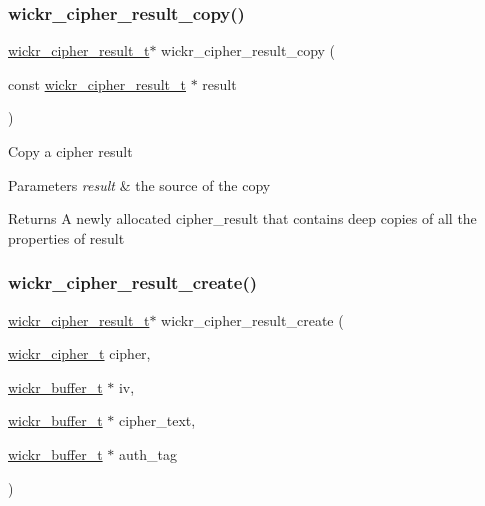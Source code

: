 \subsubsection{\texorpdfstring{wickr\_cipher\_result\_copy()}{wickr\_cipher\_result\_copy()}}
{\footnotesize\ttfamily \mbox{\hyperlink{structwickr__cipher__result}{wickr\+\_\+cipher\+\_\+result\+\_\+t}}$\ast$ wickr\+\_\+cipher\+\_\+result\+\_\+copy (\begin{DoxyParamCaption}\item[{const \mbox{\hyperlink{structwickr__cipher__result}{wickr\+\_\+cipher\+\_\+result\+\_\+t}} $\ast$}]{result }\end{DoxyParamCaption})}

Copy a cipher result


\begin{DoxyParams}{Parameters}
{\em result} & the source of the copy \\
\hline
\end{DoxyParams}
\begin{DoxyReturn}{Returns}
A newly allocated cipher\+\_\+result that contains deep copies of all the properties of \textquotesingle{}result\textquotesingle{} 
\end{DoxyReturn}
\mbox{\label{group__wickr__cipher_ga234b60967d0b3ef0088ca3ac30755dde}} 
\subsubsection{\texorpdfstring{wickr\_cipher\_result\_create()}{wickr\_cipher\_result\_create()}}
{\footnotesize\ttfamily \mbox{\hyperlink{structwickr__cipher__result}{wickr\+\_\+cipher\+\_\+result\+\_\+t}}$\ast$ wickr\+\_\+cipher\+\_\+result\+\_\+create (\begin{DoxyParamCaption}\item[{\mbox{\hyperlink{structwickr__cipher}{wickr\+\_\+cipher\+\_\+t}}}]{cipher,  }\item[{\mbox{\hyperlink{structwickr__buffer}{wickr\+\_\+buffer\+\_\+t}} $\ast$}]{iv,  }\item[{\mbox{\hyperlink{structwickr__buffer}{wickr\+\_\+buffer\+\_\+t}} $\ast$}]{cipher\+\_\+text,  }\item[{\mbox{\hyperlink{structwickr__buffer}{wickr\+\_\+buffer\+\_\+t}} $\ast$}]{auth\+\_\+tag }\end{DoxyParamCaption})}

